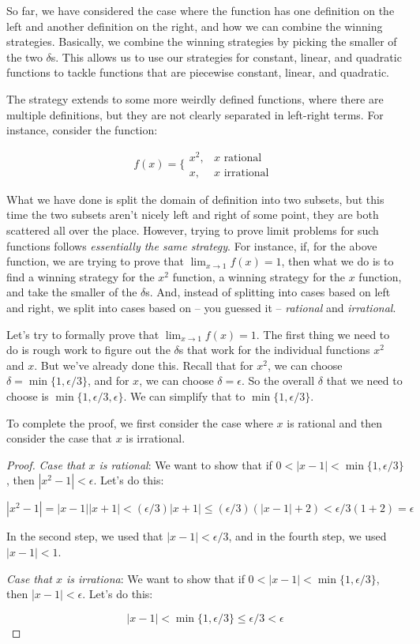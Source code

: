 \documentclass[10pt]{amsart}
\begin{document}
So far, we have considered the case where the function has one
definition on the left and another definition on the right, and how we
can combine the winning strategies. Basically, we combine the winning
strategies by picking the smaller of the two $\delta$s. This allows us
to use our strategies for constant, linear, and quadratic functions to
tackle functions that are piecewise constant, linear, and quadratic.

The strategy extends to some more weirdly defined functions, where
there are multiple definitions, but they are not clearly separated in
left-right terms. For instance, consider the function:

$$f(x) = \lbrace\begin{array}{ll}x^2, & x \text{ rational } \\ x, & x \text{ irrational }\end{array}$$

What we have done is split the domain of definition into two subsets,
but this time the two subsets aren't nicely left and right of some
point, they are both scattered all over the place. However, trying to
prove limit problems for such functions follows {\em essentially the
same strategy}. For instance, if, for the above function, we are
trying to prove that $\lim_{x \to 1} f(x) = 1$, then what we do is to
find a winning strategy for the $x^2$ function, a winning strategy for
the $x$ function, and take the smaller of the $\delta$s. And, instead
of splitting into cases based on left and right, we split into cases
based on -- you guessed it -- {\em rational} and {\em irrational}.

Let's try to formally prove that $\lim_{x \to 1} f(x) = 1$. The first
thing we need to do is rough work to figure out the $\delta$s that
work for the individual functions $x^2$ and $x$. But we've already
done this. Recall that for $x^2$, we can choose $\delta = \min \{ 1,
\epsilon/3 \}$, and for $x$, we can choose $\delta = \epsilon$. So the
overall $\delta$ that we need to choose is $\min \{1, \epsilon/3,
\epsilon \}$. We can simplify that to $\min \{ 1, \epsilon/3\}$.

To complete the proof, we first consider the case where $x$
is rational and then consider the case that $x$ is irrational.

\begin{proof}
  {\em Case that $x$ is rational}: We want to show that if $0 < |x -
  1| < \min \{ 1, \epsilon/3 \}$, then $|x^2 - 1| < \epsilon$. Let's
  do this:

  $$|x^2 - 1| = |x - 1||x + 1| < (\epsilon/3)|x + 1| \le (\epsilon/3)(|x - 1| + 2) < \epsilon/3( 1 + 2) = \epsilon$$

  In the second step, we used that $|x - 1| < \epsilon/3$, and in the
  fourth step, we used $|x - 1| < 1$.

  {\em Case that $x$ is irrationa}: We want to show that if $0 < |x -
  1| < \min \{1 , \epsilon/3 \}$, then |$x - 1| < \epsilon$. Let's do
  this:

  $$|x - 1| < \min \{ 1, \epsilon/3 \} \le \epsilon/3 <  \epsilon$$
\end{proof}
\end{document}
